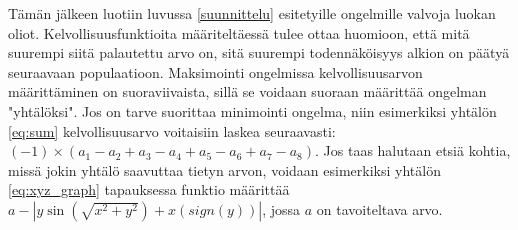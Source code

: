 Tämän jälkeen luotiin luvussa \ref{suunnittelu} esitetyille ongelmille valvoja luokan oliot.
Kelvollisuusfunktioita määriteltäessä tulee ottaa huomioon, että mitä suurempi siitä palautettu arvo on,
sitä suurempi todennäköisyys alkion on päätyä seuraavaan populaatioon. Maksimointi ongelmissa kelvollisuusarvon
määrittäminen on suoraviivaista, sillä se voidaan suoraan määrittää ongelman "yhtälöksi".
Jos on tarve suorittaa minimointi ongelma, niin esimerkiksi yhtälön \ref{eq:sum} kelvollisuusarvo voitaisiin laskea seuraavasti:
\((-1)\times(a_1 - a_2 + a_3 - a_4 + a_5 - a_6 + a_7 - a_8)\). Jos taas halutaan etsiä kohtia, missä jokin yhtälö
saavuttaa tietyn arvon, voidaan esimerkiksi yhtälön \ref{eq:xyz_graph} tapauksessa funktio määrittää
\(a - \left| y \sin{ \left( \sqrt {x^2 + y^2} \right) } + x \left( sign(y) \right) \right|\), jossa \(a\) on tavoiteltava arvo.

